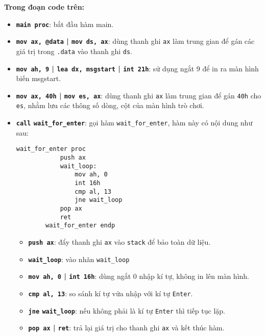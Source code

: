 \vspace{0.4cm}
\noindent \textbf{Trong đoạn code trên:}
\begin{itemize}
    \itemsep0.2cm
    \item \textbf{\texttt{main proc}}: bắt đầu hàm main.
    \item \textbf{\texttt{mov ax, @data} | \texttt{mov ds, ax}}: dùng thanh ghi \texttt{ax} làm trung gian để gán các giá trị trong \texttt{.data} vào thanh ghi \texttt{ds}.
    \item \textbf{\texttt{mov ah, 9} | \texttt{lea dx, msgstart} | \texttt{int 21h}}: sử dụng ngắt 9 để in ra màn hình biến msgstart.
    \item \textbf{\texttt{mov ax, 40h} | \texttt{mov es, ax}}: dùng thanh ghi \texttt{ax} làm trung gian để gán \texttt{40h} cho \texttt{es}, nhằm lưu các thông số dòng, cột của màn hình trò chơi.
    \item \textbf{\texttt{call} \texttt{wait\_for\_enter}}: gọi hàm \texttt{wait\_for\_enter}, hàm này có nội dung như sau:
    
    \vspace{0.3cm}
    \begin{lstlisting}[style=asm]
        wait_for_enter proc
            push ax 
            wait_loop:
                mov ah, 0      
                int 16h        
                cmp al, 13      
                jne wait_loop  
            pop ax
            ret
        wait_for_enter endp  
    \end{lstlisting}
    \vspace{0.3cm}

    \begin{itemize}
        \item \textbf{\texttt{push ax}}: đẩy thanh ghi \texttt{ax} vào \texttt{stack} để bảo toàn dữ liệu.
        \item \textbf{\texttt{wait\_loop}}: vào nhãn \texttt{wait\_loop}
        \item \textbf{\texttt{mov ah, 0} | \texttt{int 16h}}: dùng ngắt 0 nhập kí tự, không in lên màn hình.
        \item \textbf{\texttt{cmp al, 13}}: so sánh kí tự vửa nhập với kí tự \texttt{Enter}.
        \item \textbf{\texttt{jne} \texttt{wait\_loop}}: nếu không phải là kí tự \texttt{Enter} thì tiếp tục lặp.
        \item \textbf{\texttt{pop ax} | \texttt{ret}}: trả lại giá trị cho thanh ghi \texttt{ax} và kết thúc hàm.
    \end{itemize}
    

\end{itemize}
